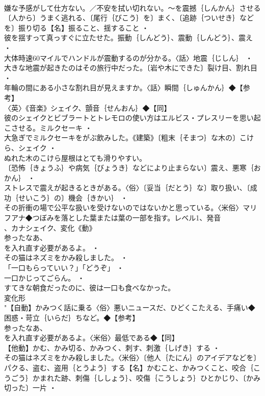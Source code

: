 \documentclass[8pt]{extreport}
\begin{document}
\begin{CJK}{UTF8}{min}
\\	嫌な予感がして仕方ない。／不安を拭い切れない。～を震撼｛しんかん｝させる〔人から〕うまく逃れる、〔尾行｛びこう｝を〕まく、〔追跡｛ついせき｝などを〕振り切る【名】振ること、揺すること ・
\\	彼を揺すって真っすぐに立たせた。振動｛しんどう｝、震動｛しんどう｝、震え ・
\\	大体時速60マイルでハンドルが震動するのが分かる。〈話〉地震｛じしん｝ ・
\\	大きな地震が起きたのはその旅行中だった。〔岩や木にできた〕裂け目、割れ目 ・
\\	年輪の間にある小さな割れ目が見えますか。〈話〉瞬間｛しゅんかん｝◆【参考】
\\	〈英〉《音楽》シェイク、顫音｛せんおん｝◆【同】
\\	彼のシェイクとビブラートとトレモロの使い方はエルビス・プレスリーを思い起こさせる。ミルクセーキ ・
\\	大急ぎでミルクセーキをがぶ飲みした。《建築》〔粗末｛そまつ｝な木の〕こけら、シェイク ・
\\	ぬれた木のこけら屋根はとても滑りやすい。
\\	〔恐怖｛きょうふ｝や病気｛びょうき｝などにより止まらない〕震え、悪寒｛おかん｝ ・
\\	ストレスで震えが起きるときがある。〈俗〉〔妥当｛だとう｝な〕取り扱い、〔成功｛せいこう｝の〕機会｛きかい｝ ・
\\	その折衝の場で公平な扱いを受けないのではないかと思っている。〈米俗〉マリフアナ◆つぼみを落とした葉または葉の一部を指す。レベル1、発音
\\	、カナシェイク、変化《動》
\\	参ったなあ、
\\	を入れ直す必要があるよ。 ・
\\	その猫はネズミをかみ殺しました。 ・
\\	「一口もらっていい？」「どうぞ」 ・
\\	一口かじってごらん。 ・
\\	すてきな朝食だったのに、彼は一口も食べなかった。
\\	変化形 
\\	"【自動】かみつく話に乗る〈俗〉悪いニュースだ、ひどくこたえる、手痛い◆困惑・苛立｛いらだ｝ちなど。◆【参考】
\\	参ったなあ、
\\	を入れ直す必要があるよ。〈米俗〉最低である◆【同】
\\	【他動】かむ、かみ切る、かみつく、刺す、刺激｛しげき｝する ・
\\	その猫はネズミをかみ殺しました。〈米俗〉〔他人｛たにん｝のアイデアなどを〕パクる、盗む、盗用｛とうよう｝する【名】かむこと、かみつくこと、咬合｛こうごう｝かまれた跡、刺傷｛ししょう｝、咬傷｛こうしょう｝ひとかじり、〔かみ切った〕一片 ・

\end{CJK}
\end{document}
